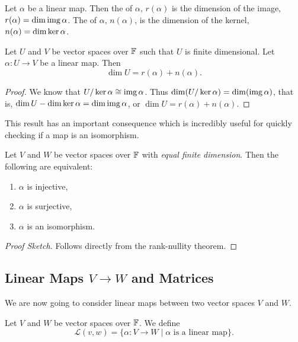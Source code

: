 \documentclass[a4paper]{scrartcl}
\begin{document}
\begin{definition}
    Let $\alpha$ be a linear map. Then the  of $\alpha$, $r(\alpha)$ is the dimension of the image, $r(\alpha) = \dim \operatorname{img} \alpha$. The  of $\alpha$, $n(\alpha)$, is the dimension of the kernel, $n(\alpha) = \dim \operatorname{ker} \alpha$.
\end{definition}

\begin{theorem}
    Let $U$ and $V$ be vector spaces over $\mathbb{F}$ such that $U$ is finite dimensional.
    Let $\alpha: U \rightarrow V$ be a linear map. Then
    $$
    \dim U = r(\alpha) + n(\alpha).
    $$
\end{theorem}
\begin{proof}
    We know that $U/\operatorname{ker} \alpha \cong \operatorname{img} \alpha$. Thus $\dim (U / \operatorname{ker} \alpha) = \dim (\operatorname{img} \alpha)$, that is, $\dim U - \dim \operatorname{ker} \alpha = \dim \operatorname{img} \alpha$, or $\dim U = r(\alpha) + n(\alpha)$.
\end{proof}

This result has an important consequence which is incredibly useful for quickly checking if a map is an isomorphism.

\begin{lemma}
    Let $V$ and $W$ be vector spaces over $\mathbb{F}$ with \emph{equal finite dimension}. Then the following are equivalent: 
    \begin{enumerate}[label=(\roman*)]
        \item $\alpha$ is injective,
        \item $\alpha$ is surjective,
        \item $\alpha$ is an isomorphism.
    \end{enumerate}
\end{lemma}
\begin{proof}[Proof Sketch]
    Follows directly from the rank-nullity theorem.
\end{proof}

\subsection{Linear Maps \texorpdfstring{$V \rightarrow W$}{V to W} and Matrices}

We are now going to consider linear maps between two vector spaces $V$ and $W$.

\begin{definition}
    Let $V$ and $W$ be vector spaces over $\mathbb{F}$. We define
    $$
    \mathcal{L}(v, w) = \{\alpha: V \rightarrow W \mid \alpha \text{ is a linear map}\}.
    $$
\end{definition}
\end{document}
